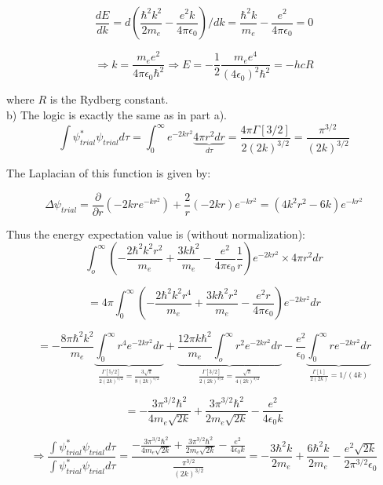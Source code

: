 $$\frac{dE}{dk} = d\left( \frac{\hbar^2k^2}{2m_e} - \frac{e^2k}
{4\pi\epsilon_0}\right) / dk = \frac{\hbar^2k}{m_e} - \frac{e^2}
{4\pi\epsilon_0} = 0$$

$$\Rightarrow k = \frac{m_ee^2}{4\pi\epsilon_0\hbar^2} \Rightarrow
E = -\frac{1}{2}\frac{m_ee^4}{(4\epsilon_0)^2\hbar^2} = -hcR$$

\noindent
where $R$ is the Rydberg constant.\\

\noindent
b) The logic is exactly the same as in part a).\\

$$\int\psi^*_{trial}\psi_{trial}d\tau = \int_0^\infty e^{-2kr^2}
\underbrace{4\pi r^2dr}_{d\tau} = \frac{4\pi\Gamma[3/2]}{2(2k)^{3/2}}
= \frac{\pi^{3/2}}{(2k)^{3/2}}$$

\noindent
The Laplacian of this function is given by:

$$\Delta\psi_{trial} = \frac{\partial}{\partial r}\left( -2kre^{-kr^2}
\right) + \frac{2}{r}\left( -2kr\right)e^{-kr^2} = \left( 4k^2r^2
- 6k\right) e^{-kr^2}$$

\noindent
Thus the energy expectation value is (without normalization):\\

$$\int_o^\infty\left( -\frac{2\hbar^2k^2r^2}{m_e} + \frac{3k\hbar^2}
{m_e} - \frac{e^2}{4\pi\epsilon_0}\frac{1}{r}\right)e^{-2kr^2}\times
4\pi r^2dr$$

$$= 4\pi\int_0^\infty\left( -\frac{2\hbar^2k^2r^4}{m_e} 
+ \frac{3k\hbar^2r^2}{m_e} - \frac{e^2r}{4\pi\epsilon_0}\right) e^{-2kr^2}dr$$

$$= -\frac{8\pi\hbar^2k^2}{m_e}\underbrace{\int_0^\infty r^4 
e^{-2kr^2}dr}_{\frac{\Gamma[5/2]}{2(2k)^{5/2}} = \frac{3\sqrt{\pi}}{8(2k)^{5/2}}}
+ \underbrace{\frac{12\pi k\hbar^2}{m_e}\int_o^\infty 
r^2e^{-2kr^2}dr}_{\frac{\Gamma[3/2]}{2(2k)^{3/2}} = \frac{\sqrt{\pi}}{4(2k)^{3/2}}}
- \frac{e^2}{\epsilon_0}\underbrace{\int_0^\infty 
re^{-2kr^2}dr}_{\frac{\Gamma[1]}{2(2k)} = 1/(4k)}
$$

$$= - \frac{3\pi^{3/2}\hbar^2}{4m_e\sqrt{2k}} + \frac{3\pi^{3/2}\hbar^2}
{2m_e\sqrt{2k}} - \frac{e^2}{4\epsilon_0k}$$

$$\Rightarrow \frac{\int\psi^*_{trial}\psi_{trial}d\tau}
{\int\psi^*_{trial}\psi_{trial}d\tau} 
= \frac{-\frac{3\pi^{3/2}\hbar^2}{4m_e\sqrt{2k}} + \frac{3\pi^{3/2}\hbar^2}
{2m_e\sqrt{2k}} - \frac{e^2}{4\epsilon_0k}}{\frac{\pi^{3/2}}{(2k)^{3/2}}}
= -\frac{3\hbar^2k}{2m_e} + \frac{6\hbar^2k}{2m_e} - \frac{e^2\sqrt{2k}}
{2\pi^{3/2}\epsilon_0}
$$

